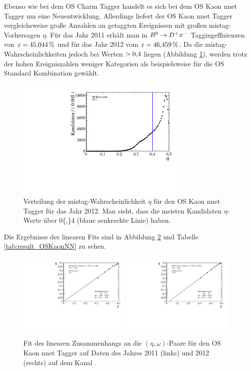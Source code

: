 Ebenso wie bei dem OS Charm Tagger handelt es sich bei dem OS Kaon nnet Tagger um eine Neuentwicklung. Allerdings liefert der OS Kaon nnet Tagger vergleichsweise große Anzahlen an getaggten Ereignissen mit großen mistag-Vorhersagen $\eta$. Für das Jahr \num{2011} erhält man in ${{B}^0}\rightarrow{\ensuremath{{D}^+}}{\ensuremath{{\pi}^-}}$ Taggingeffizienzen von $\varepsilon=\SI{45{,}044}{\%}$ und für das Jahr \num{2012} vom $\varepsilon=\SI{46{,}459}{\%}$. Da die mistag-Wahrscheinlichkeiten jedoch bei Werten $>\num{0{,}4}$ liegen (Abbildung \ref{fig:eta_oskaon}), werden trotz der hohen Ereigniszahlen weniger Kategorien als beispielsweise für die OS Standard Kombination gewählt. 
\begin{figure}[htbp]
	\centering
		\includegraphics[width=0.75\textwidth]{fig/Eta_OSKaon.pdf}
	\caption{Verteilung der mistag-Wahrscheinlichkeit $\eta$ für den OS Kaon nnet Tagger für das Jahr \num{2012}. Man sieht, dass die meisten Kandidaten $\eta$-Werte über \num{0{,}4} (blaue senkrechte Linie) haben.}
	\label{fig:eta_oskaon} 
\end{figure} 
Die Ergebnisse der linearen Fits sind in Abbildung \ref{fig:fit_OSKaonNN} und Tabelle \ref{tab:result_OSKaonNN} zu sehen.
\begin{figure}[htbp]
	\centering
		\includegraphics[width=0.49\textwidth]{fig/2011_OSKaonNN.pdf}
		\includegraphics[width=0.49\textwidth]{fig/2012_OSKaonNN.pdf}
	\caption{Fit des linearen Zusammenhangs an die $(\eta,\omega)$-Paare für den OS Kaon nnet Tagger auf Daten des Jahres \num{2011} (links) und \num{2012} (rechts) auf dem Kanal \mbox{\BdToDpi}.}
	\label{fig:fit_OSKaonNN} 
\end{figure} 
